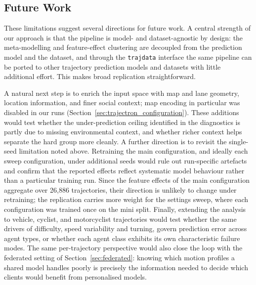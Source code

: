 \documentclass[12pt]{article}
\begin{document}
\subsection{Future Work}

These limitations suggest several directions for future work. A central strength of our approach is that the pipeline is model- and dataset-agnostic by design: the meta-modelling and feature-effect clustering are decoupled from the prediction model and the dataset, and through the \texttt{trajdata} interface \citep{ivanovic2023trajdata} the same pipeline can be ported to other trajectory prediction models and datasets with little additional effort. This makes broad replication straightforward.

A natural next step is to enrich the input space with map and lane geometry, location information, and finer social context; map encoding in particular was disabled in our runs (Section~\ref{sec:trajectron_configuration}). These additions would test whether the under-prediction ceiling identified in the diagnostics is partly due to missing environmental context, and whether richer context helps separate the hard group more cleanly. A further direction is to revisit the single-seed limitation noted above. Retraining the main configuration, and ideally each sweep configuration, under additional seeds would rule out run-specific artefacts and confirm that the reported effects reflect systematic model behaviour rather than a particular training run. Since the feature effects of the main configuration aggregate over 26,886 trajectories, their direction is unlikely to change under retraining; the replication carries more weight for the settings sweep, where each configuration was trained once on the mini split. Finally, extending the analysis to vehicle, cyclist, and motorcyclist trajectories would test whether the same drivers of difficulty, speed variability and turning, govern prediction error across agent types, or whether each agent class exhibits its own characteristic failure modes. The same per-trajectory perspective would also close the loop with the federated setting of Section~\ref{sec:federated}: knowing which motion profiles a shared model handles poorly is precisely the information needed to decide which clients would benefit from personalised models.



\end{document}
